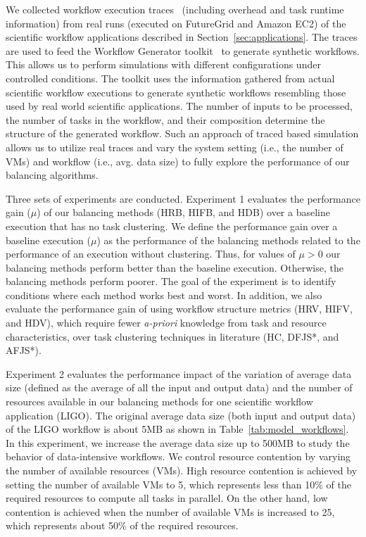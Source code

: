 We collected workflow execution traces~\cite{Juve2013,Chen2011} (including overhead and task runtime information) from real runs (executed on FutureGrid and Amazon EC2) of the scientific workflow applications described in Section~\ref{sec:applications}. The traces are used to feed the Workflow Generator toolkit~\cite{WorkflowGenerator} to generate synthetic workflows. This allows us to perform simulations with different configurations under controlled conditions. The toolkit uses the information gathered from actual scientific workflow executions to generate synthetic workflows resembling those used by real world scientific applications. The number of inputs to be processed, the number of tasks in the workflow, and their composition determine the structure of the generated workflow. Such an approach of traced based simulation allows us to utilize real traces and vary the system setting (i.e., the number of VMs) and workflow (i.e., avg. data size) to fully explore the performance of our balancing algorithms. 

Three sets of experiments are conducted. Experiment 1 evaluates the performance gain ($\mu$) of our balancing methods (HRB, HIFB, and HDB) over a baseline execution that has no task clustering. We define the performance gain over a baseline execution ($\mu$) as the performance of the balancing methods related to the performance of an execution without clustering. Thus, for values of $\mu > 0$ our balancing methods perform better than the baseline execution. Otherwise, the balancing methods perform poorer. The goal of the experiment is to identify conditions where each method works best and worst. In addition, we also evaluate the performance gain of using workflow structure metrics (HRV, HIFV, and HDV), which require fewer \emph{a-priori} knowledge from task and resource characteristics, over task clustering techniques in literature (HC, DFJS*, and AFJS*).

Experiment 2 evaluates the performance impact of the variation of average data size (defined as the average of all the input and output data) and the number of resources available in our balancing methods for one scientific workflow application (LIGO). The original average data size (both input and output data) of the LIGO workflow is about 5MB as shown in Table~\ref{tab:model_workflows}. In this experiment, we increase the average data size up to 500MB to study the behavior of data-intensive workflows. We control resource contention by varying the number of available resources (VMs). High resource contention is achieved by setting the number of available VMs to 5, which represents less than 10\% of the required resources to compute all tasks in parallel. On the other hand, low contention is achieved when the number of available VMs is increased to 25, which represents about 50\% of the required resources.

